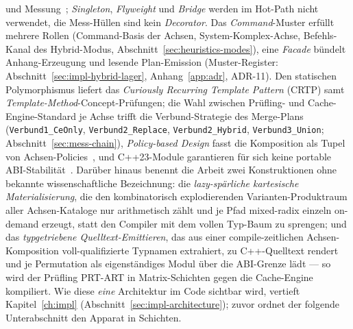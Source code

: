 \begin{nurkurz}
und Messung~\cite{gamma1994patterns}; \emph{Singleton}, \emph{Flyweight} und \emph{Bridge} werden im Hot-Path
nicht verwendet, die Mess-Hüllen sind kein \emph{Decorator}. Das \emph{Command}-Muster erfüllt mehrere Rollen
(Command-Basis der Achsen, System-Komplex-Achse, Befehls-Kanal des Hybrid-Modus,
Abschnitt~\ref{sec:heuristics-modes}), eine \emph{Facade} bündelt Anhang-Erzeugung und lesende Plan-Emission
(Muster-Register: Abschnitt~\ref{sec:impl-hybrid-lager}, Anhang~\ref{app:adr}, ADR-11). Den statischen
Polymorphismus liefert das \emph{Curiously Recurring Template Pattern} (CRTP) samt
\emph{Template-Method}-Concept-Prüfungen; die Wahl zwischen Prüfling- und Cache-Engine-Standard je Achse trifft
die Verbund-Strategie des Merge-Plans (\texttt{Verbund1\_CeOnly}, \texttt{Verbund2\_Replace},
\texttt{Verbund2\_Hybrid}, \texttt{Verbund3\_Union}; Abschnitt~\ref{sec:mess-chain}), \emph{Policy-based
Design} fasst die Komposition als Tupel von Achsen-Policies~\cite{alexandrescu2001modern}, und C++23-Module
garantieren für sich keine portable ABI-Stabilität~\cite{wg21_modules_abi}. Darüber hinaus benennt die Arbeit
zwei Konstruktionen ohne bekannte wissenschaftliche Bezeichnung: die \emph{lazy-spärliche kartesische
Materialisierung}, die den kombinatorisch explodierenden Varianten-Produktraum aller Achsen-Kataloge nur
arithmetisch zählt und je Pfad mixed-radix einzeln on-demand erzeugt, statt den Compiler mit dem vollen
Typ-Baum zu sprengen; und das \emph{typgetriebene Quelltext-Emittieren}, das aus einer compile-zeitlichen
Achsen-Komposition voll-qualifizierte Typnamen extrahiert, zu C++-Quelltext rendert und je Permutation als
eigenständiges Modul über die ABI-Grenze lädt --- so wird der Prüfling PRT-ART in Matrix-Schichten gegen die
Cache-Engine kompiliert. Wie diese \emph{eine} Architektur im Code sichtbar wird, vertieft Kapitel~\ref{ch:impl}
(Abschnitt~\ref{sec:impl-architecture}); zuvor ordnet der folgende Unterabschnitt den Apparat in Schichten.
\end{nurkurz}


